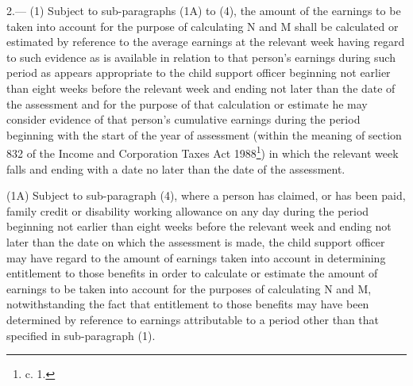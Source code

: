 \documentclass[12pt,a4paper]{article}
\begin{document}
\medskip

2.—%
%
%
%
(1) Subject to sub-paragraphs 
(1A)  %
to (4), the amount of the earnings to be taken into account for the purpose of calculating N and M shall be calculated or estimated by reference to the average earnings at the relevant week having regard to such evidence as is available in relation to that person’s earnings during such period as appears appropriate to the child support officer beginning not earlier than eight weeks before the relevant week and ending not later than the date of the assessment and for the purpose of that calculation or estimate he may consider evidence of that person’s cumulative earnings during the period beginning with the start of the year of assessment (within the meaning of section 832 of the Income and Corporation Taxes Act 1988\footnote{ c. 1.}) in which the relevant week falls and ending with a date no later than the date of the assessment.

(1A) Subject to sub-paragraph (4), where a person has claimed, or has been paid, family credit or disability working allowance on any day during the period beginning not earlier than eight weeks before the relevant week and ending not later than the date on which the assessment is made, the child support officer may have regard to the amount of earnings taken into account in determining entitlement to those benefits in order to calculate or estimate the amount of earnings to be taken into account for the purposes of calculating N and M, notwithstanding the fact that entitlement to those benefits may have been determined by reference to earnings attributable to a period other than that specified in sub-paragraph (1).
\end{document}
